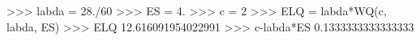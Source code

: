 
>>> labda = 28./60
>>> ES = 4.
>>> c = 2
>>> ELQ = labda*WQ(c, labda, ES)
>>> ELQ
12.616091954022991
>>> c-labda*ES
0.1333333333333333

